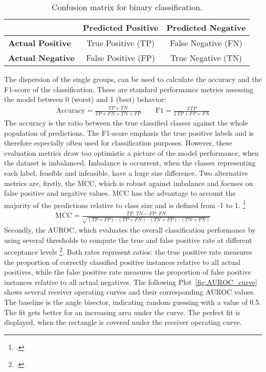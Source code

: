 \begin{table}[ht]
	\centering
	\small
	\begin{tabular}{@{}lcc@{}}
		\toprule
		                         & \textbf{Predicted Positive} & \textbf{Predicted Negative} \\
		\midrule
		\textbf{Actual Positive} & True Positive (TP)          & False Negative (FN)         \\
		\textbf{Actual Negative} & False Positive (FP)         & True Negative (TN)          \\
		\bottomrule
	\end{tabular}
	\caption{Confusion matrix for binary classification.}
	\label{tab:confusion_matrix}
\end{table}

The dispersion of the single groups, can be used to calculate the accuracy and the F1-score of the classification.
These are standard performance metrics assessing the model between 0 (worst) and 1 (best) behavior:
\begin{align}
	\text{Accuracy}=\frac{TP+TN}{TP+FN+TN+FP}
	\qquad
	\text{F1}=\frac{2\,TP}{2\,TP+FP+FN}
\end{align}
The accuracy is the ratio between the true classified classes against the whole population
of predictions. The F1-score emphasis the true positive labels and is therefore especially
often used for classification purposes.
However, these evaluation metrics draw too optimistic a picture of the model performance,
when the dataset is imbalanced. Imbalance is occurrent,
when the classes representing each label, feasible and infeasible, have a huge size difference.
Two alternative metrics are, firstly, the \gls{MCC}, which is robust against imbalance
and focuses on  false positive and negative values. \gls{MCC} has the advantage to account the majority of the predictions
relative to class size and is defined from -1 to 1. \footcite[cf.][pp. 2--3, 5]{chicco_advantages_2020}
\begin{align}
	\text{MCC}=\frac{TP \cdot TN - FP \cdot FN}{\sqrt{(TP+FP)\cdot(TP+FN)\cdot(TN+FP)\cdot(TN+FN)}}
\end{align}
Secondly, the \gls{AUROC}, which evaluates the overall classification performance by using several thresholds to compute the true and false
positive rate  at different acceptance levels \footcite[cf.][p. 2 f.]{chicco_advantages_2020}. Both rates represent ratios:
the true positive rate measures the proportion of correctly classified positive instances relative to all
actual positives, while the false positive rate measures the proportion of false positive instances
relative to all actual negatives.
The following Plot~\ref{fig:AUROC_curve} shows several receiver operating curves and their corresponding \gls{AUROC} values.
The baseline is the angle bisector, indicating random guessing with a value of 0.5. The fit gets better
for an increasing area under the curve. The perfect fit is displayed, when the rectangle is covered under the receiver operating curve.


